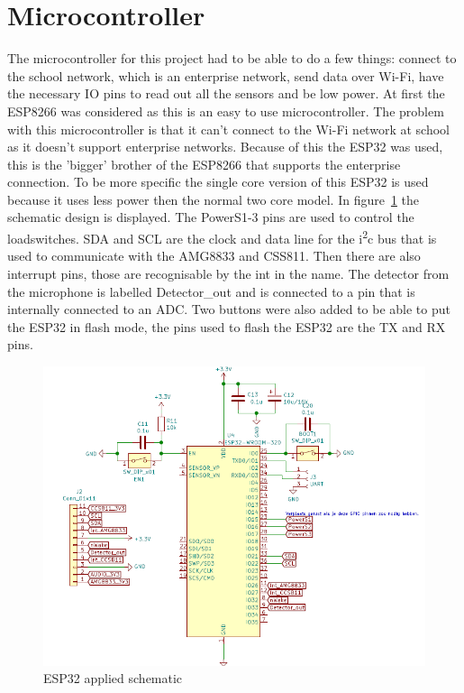 \documentclass[11pt,a4paper]{article}
\begin{document}
\section{Microcontroller}
The microcontroller for this project had to be able to do a few things: connect to the school network, which is an enterprise network, send data over Wi-Fi, have the necessary IO pins to read out all the sensors and be low power.
At first the ESP8266 was considered as this is an easy to use microcontroller. The problem with this microcontroller is that it can't connect to the Wi-Fi network at school as it doesn't support enterprise networks.
Because of this the ESP32 was used, this is the 'bigger' brother of the ESP8266 that supports the enterprise connection. To be more specific the single core version of this ESP32 is used because it uses less power then the normal two core model.
In figure~\ref{fig:ESP32_toegepast} the schematic design is displayed. The PowerS1-3 pins are used to control the loadswitches. SDA and SCL are the clock and data line for the i\textsuperscript{2}c  bus that is used to communicate with the AMG8833 and CSS811.
Then there are also interrupt pins, those are recognisable by the int in the name. The detector from the microphone is labelled Detector\_out and is connected to a pin that is internally connected to an ADC.
Two buttons were also added to be able to put the ESP32 in flash mode, the pins used to flash the ESP32 are the TX and RX pins. 
\begin{figure}[H]
	\centering
	\includegraphics[width=1.0\linewidth]{ESP32_toegepast.png}
	\caption{ESP32 applied schematic}
	\label{fig:ESP32_toegepast}
\end{figure}
\end{document}
